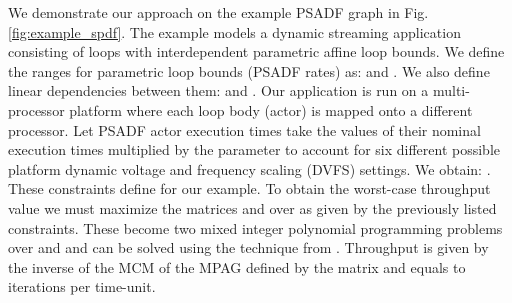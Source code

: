 \documentclass[]{eptcs}
\begin{document}
We demonstrate our approach on the example PSADF graph in Fig. \ref{fig:example_spdf}. The example models a dynamic streaming application consisting of loops with interdependent parametric affine loop bounds. We define the ranges for parametric loop bounds (PSADF rates) as:  and . We also define linear dependencies between them:  and . Our application is run on a multi-processor platform where each loop body (actor) is mapped onto a different processor. Let PSADF actor execution times take the values of their nominal execution times multiplied by the parameter  to account for six different possible platform dynamic voltage and frequency scaling (DVFS) settings. We obtain: . These constraints define  for our example. To obtain the worst-case throughput value we must maximize the matrices  and  over  as given by the previously listed constraints. These become two mixed integer polynomial programming problems over  and  and can be solved using the technique from \cite{2sher:all}. Throughput is given by the inverse of the MCM of the MPAG defined by the matrix  and equals to  iterations per time-unit.
\end{document}
